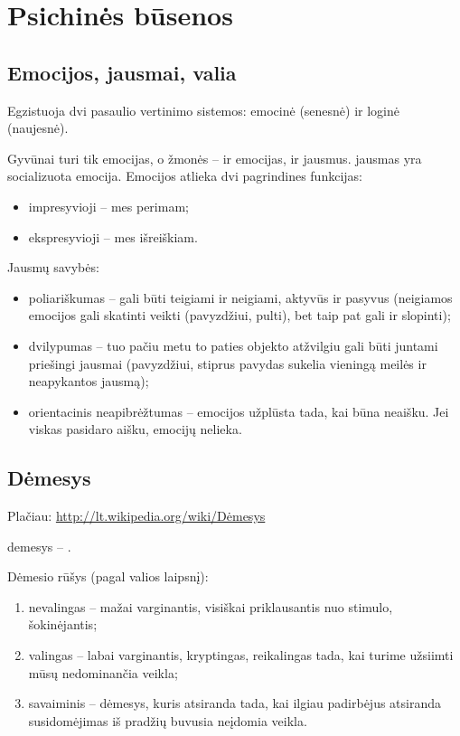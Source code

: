 \chapter{Psichinės būsenos}

\label{tema:psichines_busenos}

\section{Emocijos, jausmai, valia}

\label{tema:emocijos}

Egzistuoja dvi pasaulio vertinimo sistemos: emocinė (senesnė) ir loginė 
(naujesnė). 

Gyvūnai turi tik emocijas, o žmonės – ir emocijas, ir jausmus. \Gls{jausmas} 
yra socializuota \gls{emocija}. Emocijos atlieka dvi pagrindines funkcijas:

\begin{itemize}
  \item impresyvioji – mes perimam;
  \item ekspresyvioji – mes išreiškiam.
\end{itemize}

Jausmų savybės:

\begin{itemize}
  \item poliariškumas – gali būti teigiami ir neigiami, aktyvūs ir pasyvus
    (neigiamos emocijos gali skatinti veikti (pavyzdžiui, pulti), bet taip 
    pat gali ir slopinti);
  \item dvilypumas – tuo pačiu metu to paties objekto atžvilgiu gali būti
    juntami priešingi jausmai (pavyzdžiui, stiprus pavydas sukelia 
    vieningą meilės ir neapykantos jausmą);
  \item orientacinis neapibrėžtumas – emocijos užplūsta tada, kai būna
    neaišku. Jei viskas pasidaro aišku, emocijų nelieka.
\end{itemize}

\section{Dėmesys}

\label{tema:demesys}

Plačiau: \url{http://lt.wikipedia.org/wiki/Dėmesys}

\Gls{demesys} – .

Dėmesio rūšys (pagal valios laipsnį):

\begin{enumerate}
  \item nevalingas – mažai varginantis, visiškai priklausantis nuo stimulo, 
    šokinėjantis;
  \item valingas – labai varginantis, kryptingas, reikalingas tada, kai 
    turime užsiimti mūsų nedominančia veikla;
  \item savaiminis – dėmesys, kuris atsiranda tada, kai ilgiau padirbėjus
    atsiranda susidomėjimas iš pradžių buvusia neįdomia veikla.
\end{enumerate}

